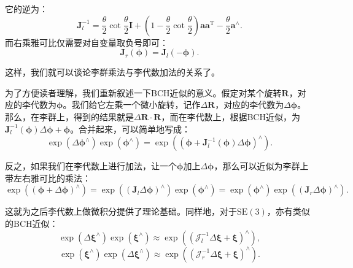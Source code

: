 它的逆为：
\begin{equation}
\bm{J}_l^{ - 1} = \frac{\theta }{2}\cot \frac{\theta }{2} \bm{I} + \left( {1 - \frac{\theta }{2}\cot \frac{\theta }{2}} \right) \bm{a} {\bm{a}^\mathrm{T}} - \frac{\theta }{2}{ \bm{a}^ \wedge }.
\end{equation}
而右乘雅可比仅需要对自变量取负号即可：
\begin{equation}
\bm{J}_r(\bm{\phi}) =\bm{J}_l(-\bm{\phi}) .
\end{equation}

这样，我们就可以谈论李群乘法与李代数加法的关系了。

为了方便读者理解，我们重新叙述一下BCH近似的意义。假定对某个旋转$\bm{R}$，对应的李代数为$\bm{\phi}$。我们给它左乘一个微小旋转，记作$\Delta \bm{R}$，对应的李代数为$\Delta \bm{\phi}$。那么，在李群上，得到的结果就是$ \Delta \bm{R} \cdot \bm{R}$，而在李代数上，根据BCH近似，为$\bm{J}_l^{-1} (\bm{\phi}) \Delta \bm{\phi} + \bm{\phi}$。合并起来，可以简单地写成：
\begin{equation}
\exp \left( {\Delta { \bm{\phi} ^ \wedge }} \right)\exp \left( {{ \bm{\phi} ^ \wedge }} \right) = \exp \left( {{{\left( { \bm{\phi}  + \bm{J}_l^{ - 1}\left( \bm{\phi}  \right)\Delta \bm{\phi} } \right)}^ \wedge }} \right).
\end{equation}

反之，如果我们在李代数上进行加法，让一个$\bm{\phi}$加上$\Delta \bm{\phi}$，那么可以近似为李群上带左右雅可比的乘法：
\begin{equation}
\exp \left( {{{\left( { \bm{\phi}  + \Delta \bm{\phi} } \right)}^ \wedge }} \right) = \exp \left( {{{\left( {{ \bm{J}_l}\Delta \bm{\phi} } \right)}^ \wedge }} \right)\exp \left( {{ \bm{\phi} ^ \wedge }} \right) = \exp \left( {{\bm{\phi} ^ \wedge }} \right)\exp \left( {{{\left( {{\bm{J}_r}\Delta \bm{\phi} } \right)}^ \wedge }} \right).
\end{equation}

这就为之后李代数上做微积分提供了理论基础。同样地，对于$\mathrm{SE}(3)$，亦有类似的BCH近似：
\begin{equation}
\exp \left( {\Delta {\bm{\xi} ^ \wedge }} \right)\exp \left( {{ \bm{\xi} ^ \wedge }} \right) \approx \exp \left( {{{\left( {{ \bm{\mathcal{J}}_l^{-1} }\Delta \bm{\xi}  + \bm{\xi} } \right)}^ \wedge }} \right),
\end{equation}
\begin{equation}
\exp \left( {{ \bm{\xi} ^ \wedge }} \right) \exp \left( {\Delta {\bm{\xi} ^ \wedge }} \right)  \approx \exp \left( {{{\left( {{ \bm{\mathcal{J}}_r^{-1} }\Delta \bm{\xi}  + \bm{\xi} } \right)}^ \wedge }} \right).
\end{equation}

